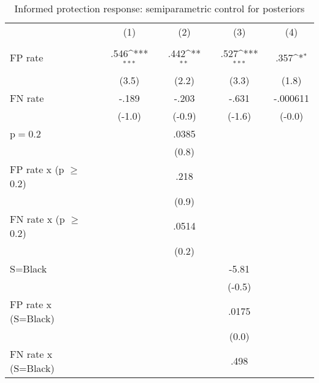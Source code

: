 \begin{table}[htbp]\centering
\def\sym#1{\ifmmode^{#1}\else\(^{#1}\)\fi}
\caption{Informed protection response: semiparametric control for posteriors}
\begin{tabular}{l*{4}{c}}
\hline\hline
                &\multicolumn{1}{c}{(1)}&\multicolumn{1}{c}{(2)}&\multicolumn{1}{c}{(3)}&\multicolumn{1}{c}{(4)}\\
                &\multicolumn{1}{c}{}&\multicolumn{1}{c}{}&\multicolumn{1}{c}{}&\multicolumn{1}{c}{}\\
\hline
FP rate         &     .546\sym{***}&     .442\sym{**} &     .527\sym{***}&     .357\sym{*}  \\
                &    (3.5)         &    (2.2)         &    (3.3)         &    (1.8)         \\
FN rate         &    -.189         &    -.203         &    -.631         & -.000611         \\
                &   (-1.0)         &   (-0.9)         &   (-1.6)         &   (-0.0)         \\
p$=$0.2         &                  &    .0385         &                  &                  \\
                &                  &    (0.8)         &                  &                  \\
FP rate x (p $\geq$ 0.2)&                  &     .218         &                  &                  \\
                &                  &    (0.9)         &                  &                  \\
FN rate x (p $\geq$ 0.2)&                  &    .0514         &                  &                  \\
                &                  &    (0.2)         &                  &                  \\
S=Black         &                  &                  &    -5.81         &                  \\
                &                  &                  &   (-0.5)         &                  \\
FP rate x (S=Black)&                  &                  &    .0175         &                  \\
                &                  &                  &    (0.0)         &                  \\
FN rate x (S=Black)&                  &                  &     .498         &                  \\

\end{tabular}
\end{table}
